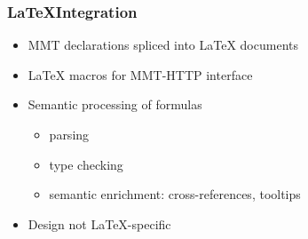 \documentclass{beamer}
\begin{document}
%

\begin{frame}\frametitle{\LaTeX Integration}
 \begin{itemize}
   \item MMT declarations spliced into {\LaTeX} documents
   \item {\LaTeX} macros for MMT-HTTP interface
   \item Semantic processing of formulas
    \begin{itemize}
     \item parsing
     \item type checking
     \item semantic enrichment: cross-references, tooltips
    \end{itemize}
  \item Design not \LaTeX-specific
 \end{itemize}
\end{frame}
\end{document}
